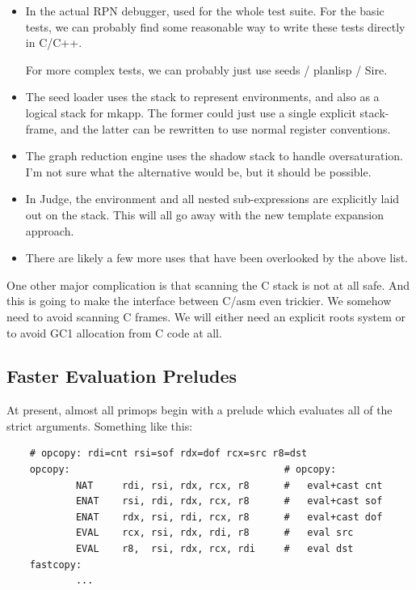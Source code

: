 \begin{itemize}
\item
    In the actual RPN debugger, used for the whole test suite.  For the
    basic tests, we can probably find some reasonable way to write these
    tests directly in C/C++.

    For more complex tests, we can probably just use seeds / planlisp
    / Sire.
\item
    The seed loader uses the stack to represent environments, and also
    as a logical stack for mkapp.  The former could just use a single
    explicit stack-frame, and the latter can be rewritten to use normal
    register conventions.
\item
    The graph reduction engine uses the shadow stack to handle
    oversaturation.  I'm not sure what the alternative would be, but it
    should be possible.
\item
    In Judge, the environment and all nested sub-expressions are
    explicitly laid out on the stack.  This will all go away with the new
    template expansion approach.
\item
    There are likely a few more uses that have been overlooked by the
    above list.
\end{itemize}

One other major complication is that scanning the C stack is not at
all safe.  And this is going to make the interface between C/asm even
trickier.  We somehow need to avoid scanning C frames.  We will either
need an explicit roots system or to avoid GC1 allocation from C code
at all.

\subsection{Faster Evaluation Preludes}

At present, almost all primops begin with a prelude which evaluates all
of the strict arguments.  Something like this:

\begin{verbatim}
    # opcopy: rdi=cnt rsi=sof rdx=dof rcx=src r8=dst
    opcopy:                                     # opcopy:
            NAT     rdi, rsi, rdx, rcx, r8      #   eval+cast cnt
            ENAT    rsi, rdi, rdx, rcx, r8      #   eval+cast sof
            ENAT    rdx, rsi, rdi, rcx, r8      #   eval+cast dof
            EVAL    rcx, rsi, rdx, rdi, r8      #   eval src
            EVAL    r8,  rsi, rdx, rcx, rdi     #   eval dst
    fastcopy:
            ...
\end{verbatim}

